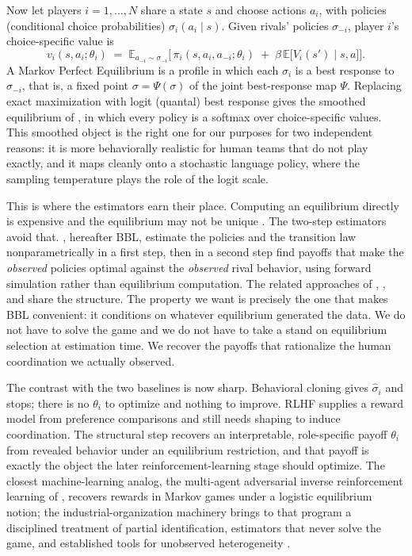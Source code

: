 \documentclass[11pt]{article}
\theoremstyle{definition}
\begin{document}
Now let players $i = 1,\dots,N$ share a state $s$ and choose actions $a_i$, with policies (conditional choice probabilities) $\sigma_i(a_i\mid s)$. Given rivals' policies $\sigma_{-i}$, player $i$'s choice-specific value is
\begin{equation}
v_i(s,a_i;\theta_i)
\;=\;
\mathbb{E}_{a_{-i}\sim\sigma_{-i}}\!\Big[\,\pi_i(s,a_i,a_{-i};\theta_i)
\;+\; \beta\,\mathbb{E}\big[V_i(s')\mid s,a\big]\Big].
\end{equation}
A Markov Perfect Equilibrium is a profile in which each $\sigma_i$ is a best response to $\sigma_{-i}$, that is, a fixed point $\sigma = \Psi(\sigma)$ of the joint best-response map $\Psi$. Replacing exact maximization with logit (quantal) best response gives the smoothed equilibrium of \citet{mckelveyPalfrey1995}, in which every policy is a softmax over choice-specific values. This smoothed object is the right one for our purposes for two independent reasons: it is more behaviorally realistic for human teams that do not play exactly, and it maps cleanly onto a stochastic language policy, where the sampling temperature plays the role of the logit scale.

This is where the estimators earn their place. Computing an equilibrium directly is expensive and the equilibrium may not be unique \citep{pakesMcGuire1994, pakesMcGuire2001}. The two-step estimators avoid that. \citet{bbl2007}, hereafter BBL, estimate the policies and the transition law nonparametrically in a first step, then in a second step find payoffs that make the \emph{observed} policies optimal against the \emph{observed} rival behavior, using forward simulation rather than equilibrium computation. The related approaches of \citet{aguirregabiriaMira2007}, \citet{pesendorferSchmidtDengler2008}, and \citet{pakesOstrovskyBerry2007} share the structure. The property we want is precisely the one that makes BBL convenient: it conditions on whatever equilibrium generated the data. We do not have to solve the game and we do not have to take a stand on equilibrium selection at estimation time. We recover the payoffs that rationalize the human coordination we actually observed.

The contrast with the two baselines is now sharp. Behavioral cloning gives $\hat\sigma_i$ and stops; there is no $\theta_i$ to optimize and nothing to improve. RLHF supplies a reward model from preference comparisons and still needs shaping to induce coordination. The structural step recovers an interpretable, role-specific payoff $\theta_i$ from revealed behavior under an equilibrium restriction, and that payoff is exactly the object the later reinforcement-learning stage should optimize. The closest machine-learning analog, the multi-agent adversarial inverse reinforcement learning of \citet{yuSongErmon2019}, recovers rewards in Markov games under a logistic equilibrium notion; the industrial-organization machinery brings to that program a disciplined treatment of partial identification, estimators that never solve the game, and established tools for unobserved heterogeneity \citep{arcidiaconoMiller2011}.
\end{document}
